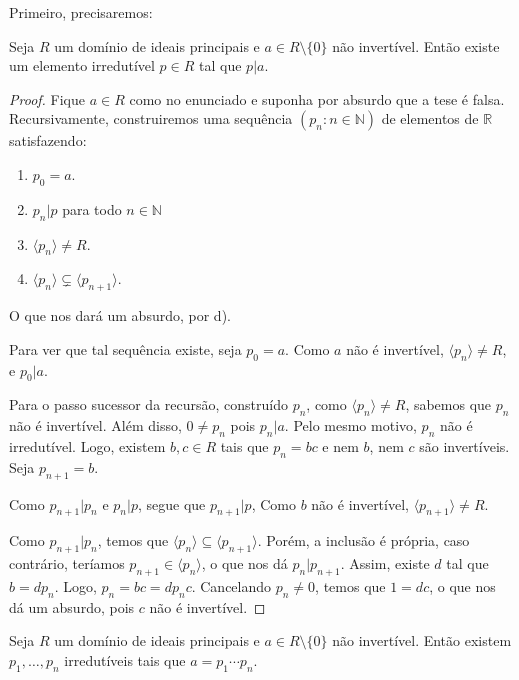 Primeiro, precisaremos:

\begin{lemma}
Seja $R$ um domínio de ideais principais e $a\in R\setminus \{0\}$ não invertível.
Então existe um elemento irredutível $p\in R$ tal que $p|a$.
\end{lemma}
\begin{proof}
    Fique $a \in R$ como no enunciado e suponha por absurdo que a tese é falsa.
    Recursivamente, construiremos uma sequência $(p_n: n \in \mathbb N)$ de elementos de $\mathbb R$ satisfazendo:
    \begin{enumerate}[label=\alph*)]
        \item $p_0=a$.
        \item $p_n|p$ para todo $n \in \mathbb N$
        \item $\langle p_n\rangle\neq R$.
        \item $\langle p_n\rangle\subsetneq \langle p_{n+1}\rangle$.
    \end{enumerate}
    O que nos dará um absurdo, por d).

    Para ver que tal sequência existe, seja $p_0=a$. Como $a$ não é invertível, $\langle p_n\rangle \neq R$, e $p_0|a$.

    Para o passo sucessor da recursão, construído $p_n$, como $\langle p_n\rangle\neq R$, sabemos que $p_n$ não é invertível.
    Além disso, $0\neq p_n$ pois $p_n|a$.
    Pelo mesmo motivo, $p_n$ não é irredutível.
    Logo, existem $b, c \in R$ tais que $p_n=bc$ e nem $b$, nem $c$ são invertíveis.
    Seja $p_{n+1}=b$.

    Como $p_{n+1}|p_n$ e $p_n|p$, segue que $p_{n+1}|p$,
    Como $b$ não é invertível, $\langle p_{n+1}\rangle\neq R$.

    Como $p_{n+1}|p_n$, temos que $\langle p_n\rangle\subseteq \langle p_{n+1}\rangle$.
    Porém, a inclusão é própria, caso contrário, teríamos $p_{n+1}\in \langle p_n\rangle$, o que nos dá $p_n|p_{n+1}$.
    Assim, existe $d$ tal que $b=dp_n$.
    Logo, $p_n=bc=dp_nc$.
    Cancelando $p_n\neq 0$, temos que $1=dc$, o que nos dá um absurdo, pois $c$ não é invertível.
\end{proof}

\begin{lemma}
    Seja $R$ um domínio de ideais principais e $a\in R\setminus \{0\}$ não invertível.
    Então existem $p_1, \dots, p_n$ irredutíveis tais que $a=p_1\cdots p_n$.
\end{lemma}

